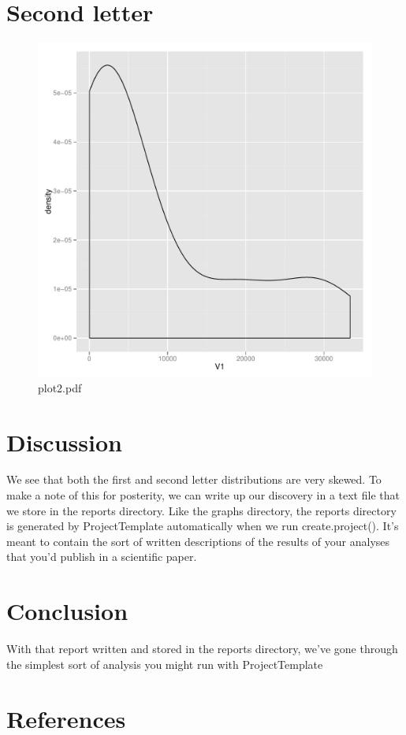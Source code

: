 \documentclass[a4paper]{article}
\begin{document}
\section{Second letter}
\begin{figure}[!h]
\centering
\includegraphics[width=\textwidth]{plot2.pdf}
\caption{plot2.pdf}
\label{fig:plot2.pdf}
\end{figure}
\clearpage

\section{Discussion}
We see that both the first and second letter distributions are very skewed. To make a note of this for posterity, we can write up our discovery in a text file that we store in the reports directory. Like the graphs directory, the reports directory is generated by ProjectTemplate automatically when we run create.project(). It's meant to contain the sort of written descriptions of the results of your analyses that you'd publish in a scientific paper.

\section{Conclusion}
With that report written and stored in the reports directory, we've gone through the simplest sort of analysis you might run with ProjectTemplate

\section{References}
\end{document}
